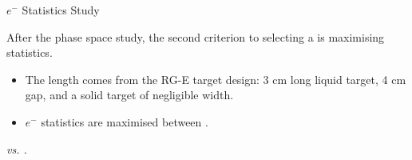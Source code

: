 \begin{frame}{$e^-$ Statistics Study}
    \label{12.21::e-_statistics_study}

    After the phase space study, the second criterion to selecting a   is maximising statistics.

    \begin{itemize}
        \item
            The length comes from the RG-E target design: 3 cm long liquid target, 4 cm gap, and a solid target of negligible width.

        \item
            $e^-$ statistics are maximised between  .
    \end{itemize}

    \begin{center}
        \begin{figure}[t]
        \end{figure}
        \scriptsize{\textit{ vs. .}}
    \end{center}
\end{frame}


